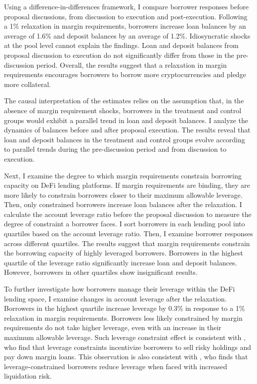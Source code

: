 \documentclass[12pt]{article}
\begin{document}
Using a difference-in-differences framework, I compare borrower responses before proposal discussions, from discussion to execution and post-execution. Following a 1\% relaxation in margin requirements, borrowers increase loan balances by an average of 1.6\% and deposit balances by an average of 1.2\%. Idiosyncratic shocks at the pool level cannot explain the findings. Loan and deposit balances from proposal discussion to execution do not significantly differ from those in the pre-discussion period. Overall, the results suggest that a relaxation in margin requirements encourages borrowers to borrow more cryptocurrencies and pledge more collateral.


The causal interpretation of the estimates relies on the assumption that, in the absence of margin requirement shocks, borrowers in the treatment and control groups would exhibit a parallel trend in loan and deposit balances. I analyze the dynamics of balances before and after proposal execution. The results reveal that loan and deposit balances in the treatment and control groups evolve according to parallel trends during the pre-discussion period and from discussion to execution.

Next, I examine the degree to which margin requirements constrain borrowing capacity on DeFi lending platforms. If margin requirements are binding, they are more likely to constrain borrowers closer to their maximum allowable leverage. Then, only constrained borrowers increase loan balances after the relaxation. I calculate the account leverage ratio before the proposal discussion to measure the degree of constraint a borrower faces. I sort borrowers in each lending pool into quartiles based on the account leverage ratio. Then, I examine borrower responses across different quartiles. The results suggest that margin requirements constrain the borrowing capacity of highly leveraged borrowers. Borrowers in the highest quartile of the leverage ratio significantly increase loan and deposit balances. However, borrowers in other quartiles show insignificant results. 

To further investigate how borrowers manage their leverage within the DeFi lending space, I examine changes in account leverage after the relaxation. Borrowers in the highest quartile increase leverage by 0.3\% in response to a 1\% relaxation in margin requirements. Borrowers less likely constrained by margin requirements do not take higher leverage, even with an increase in their maximum allowable leverage. Such leverage constraint effect is consistent with \cite{bian2021margin}, who find that leverage constraints incentivize borrowers to sell risky holdings and pay down margin loans. This observation is also consistent with \cite{mueller2023defi}, who finds that leverage-constrained borrowers reduce leverage when faced with increased liquidation risk.
\end{document}

